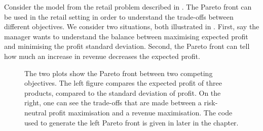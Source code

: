 \documentclass[main.tex]{subfiles}
\begin{document}
\begin{example}\label{ex:retail_pareto}
  Consider the model from the retail problem described in
  .
  The Pareto front can be used in the retail setting in order to understand the
  trade-offs between different objectives.
  We consider two situations, both illustrated in
  .
  First, say the manager wants to understand the balance between
  maximising expected profit and minimising the profit standard
  deviation.
  Second, the Pareto front can tell how much an increase in revenue
  decreases the expected profit.
  \begin{figure}[htbp]
    \centering
    \begin{subfigure}[h]{.5\textwidth}
    \end{subfigure}%
    \begin{subfigure}[h]{.5\textwidth}
    \end{subfigure}
    \caption[Two Pareto fronts between competing objects for a retail example.]{The two plots show the Pareto front between two competing
      objectives. The left figure compares the expected profit of three
      products, compared to the standard deviation of profit.
      On the right, one can see the trade-offs that are made between
      a risk-neutral profit maximisation and a revenue maximisation.
      The code used to generate the left Pareto front is given in
       later in the chapter.
    }\label{fig:pareto_std_prof_rev}

\end{figure}
\end{example}
\end{document}
